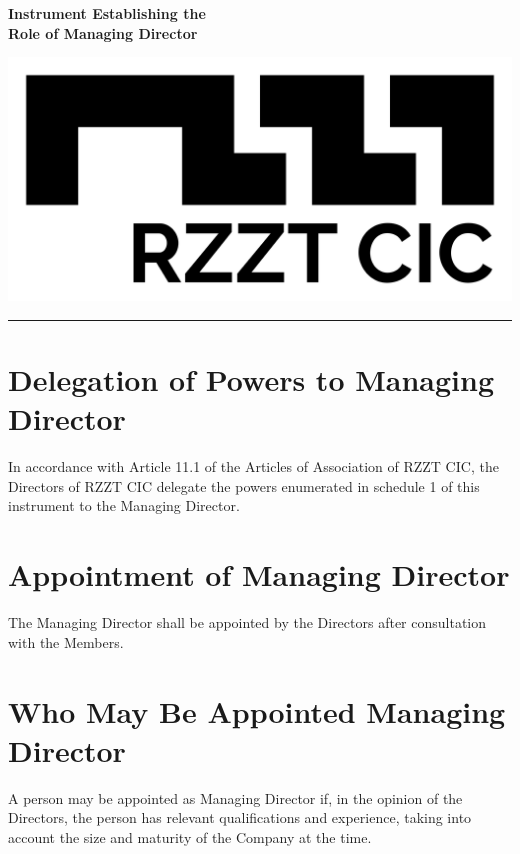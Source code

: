 \documentclass[a4paper,10pt]{article}
\begin{document}
\thispagestyle{firstpage}

\begin{minipage}[b]{0.75\textwidth}
  \raggedright
  \LARGE{\textbf{Instrument Establishing the\\Role of Managing Director}}
  \vspace{0.05em}
\end{minipage}
%
\begin{minipage}[b]{0.25\textwidth}
  \raggedleft
  \includegraphics[width=1\textwidth]{logo-black.jpg}
\end{minipage}

\hrule

\vspace{2em}

\section{Delegation of Powers to Managing Director}

In accordance with Article 11.1 of the Articles of Association of RZZT CIC, the Directors of RZZT CIC delegate the powers enumerated in schedule 1 of this instrument to the Managing Director.

\section{Appointment of Managing Director}

The Managing Director shall be appointed by the Directors after consultation with the Members.

\section{Who May Be Appointed Managing Director}

A person may be appointed as Managing Director if, in the opinion of the Directors, the person has relevant qualifications and experience, taking into account the size and maturity of the Company at the time.
\end{document}
